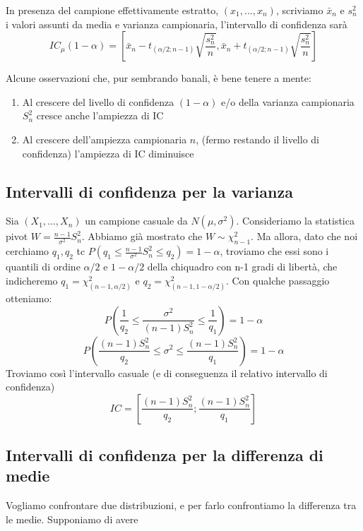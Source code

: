 In presenza del campione effettivamente estratto, $(x_1,...,x_n)$, 
scriviamo $\bar{x}_n$ e $s^2_n$ i valori assunti da media e varianza campionaria,
l'intervallo di confidenza sarà $$IC_{\mu}(1-\alpha)=
\left[\bar{x}_n -
 t_{(\alpha / 2;n-1)} 
 \sqrt{\frac{s^2_n}{n}},
  \bar{x}_n + t_{(\alpha / 2;n-1)}\sqrt{\frac{s^2_n}{n}}\right]$$
\begin{oss}
Alcune osservazioni che, pur sembrando banali, è bene tenere a mente:
\begin{enumerate}
\item Al crescere del livello di confidenza $(1-\alpha)$ e/o della varianza campionaria $S^2_n$ cresce anche l'ampiezza di IC
\item Al crescere dell'ampiezza campionaria $n$, (fermo restando il livello di confidenza) l'ampiezza di IC diminuisce
\end{enumerate}
\end{oss}

\subsection{Intervalli di confidenza per la varianza}
Sia $(X_1,...,X_n)$ un campione casuale da $N(\mu,\sigma^2)$.
Consideriamo la statistica pivot $W=\frac{n-1}{\sigma^2} S^2_n$. Abbiamo già mostrato che $W \sim \chi^2_{n-1}$. 
Ma allora, dato che noi cerchiamo $q_1,q_2$ tc $P(q_1 \leq \frac{n-1}{\sigma^2} S^2_n \leq q_2)=1-\alpha$, troviamo che essi sono i quantili di ordine $\alpha / 2$ e $1 - \alpha / 2$ della chiquadro con n-1 gradi di libertà, che indicheremo $q_1=\chi^2_{(n-1,\alpha / 2)}$ e $q_2=\chi^2_{(n-1,1 - \alpha / 2)}$.
Con qualche passaggio otteniamo:
$$P(\frac{1}{q_2} \leq \frac{\sigma^2}{(n-1) S^2_n} \leq \frac{1}{q_1})=1-\alpha$$
$$P(\frac{(n-1) S^2_n}{q_2} \leq \sigma^2 \leq \frac{(n-1) S^2_n}{q_1})=1-\alpha$$
Troviamo così l'intervallo casuale (e di conseguenza il relativo intervallo di confidenza) $$IC=\left[ \frac{(n-1)S^2_n}{q_2};\frac{(n-1)S^2_n}{q_1} \right]$$
\subsection{Intervalli di confidenza per la differenza di medie}
Vogliamo confrontare due distribuzioni, e per farlo confrontiamo la differenza tra le medie.
Supponiamo di avere 